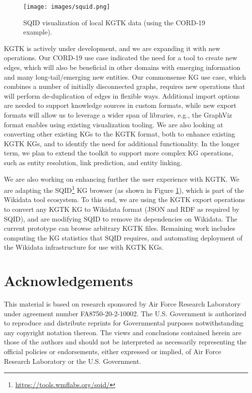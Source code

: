 \documentclass[runningheads]{llncs}
\begin{document}
\begin{figure}[t!]
    \centering
    \texttt{[image: images/squid.png]}
    \caption{SQID visualization of local KGTK data (using the CORD-19 example).}
    \label{fig:squid}
\end{figure}

KGTK is actively under development, and we are expanding it with new operations. Our CORD-19 use case indicated the need for a tool to create new edges, which will also be beneficial in other domains with emerging information and many  long-tail/emerging new entities. Our commonsense KG use case, which combines a number of initially disconnected graphs, requires new operations that will perform de-duplication of edges in flexible ways. Additional import options are needed to support knowledge sources in custom formats, while new export formats will allow us to leverage a wider span of libraries, e.g., the GraphViz format enables using existing visualization tooling. 
We are also looking at converting other existing KGs to the KGTK format, both to enhance existing KGTK KGs, and to identify the need for additional functionality. In the longer term, we plan to extend the toolkit to support more complex KG operations, such as entity resolution, link prediction, and entity linking.


We are also working on enhancing further the user experience with KGTK. 
We are adapting the SQID\footnote{\url{https://tools.wmflabs.org/sqid/}} KG browser (as shown in Figure \ref{fig:squid}), which is part of the Wikidata tool ecosystem. To this end, we are using the KGTK export operations to convert any KGTK KG to Wikidata format (JSON and RDF as required by SQID), and are modifying SQID to remove its dependencies on Wikidata. The current prototype can browse arbitrary KGTK files. Remaining work includes computing the KG statistics that SQID requires, and 
automating deployment of the Wikidata infrastructure for use with KGTK KGs.


\section*{Acknowledgements}
This material is based on research sponsored by Air Force Research Laboratory under agreement number FA8750-20-2-10002. The U.S. Government is authorized to reproduce and distribute reprints for Governmental purposes notwithstanding any copyright notation thereon. The views and conclusions contained herein are those of the authors and should not be interpreted as necessarily representing the official policies or endorsements, either expressed or implied, of Air Force Research Laboratory or the U.S. Government.
\end{document}
